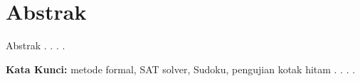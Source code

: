 \chapter*{Abstrak}

Abstrak . . . .
  
\vspace{0.5 cm}
\begin{flushleft}
{\textbf{Kata Kunci:}  metode formal, SAT solver, Sudoku, pengujian kotak hitam . . . . }
\end{flushleft}